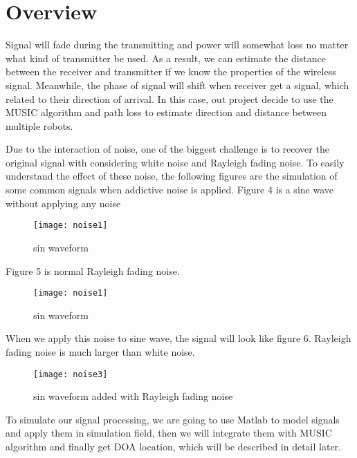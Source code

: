 
\section{Overview}
\label{sec:overview}
	Signal will fade during the transmitting and power will somewhat loss no matter what kind of transmitter be used. As a result, we can estimate the distance between the receiver and transmitter if we know the properties of the wireless signal. Meanwhile, the phase of signal will shift when receiver get a signal, which related to their direction of arrival. In this case, out project decide to use the MUSIC algorithm and path loss to estimate direction and distance between multiple robots.
\par
	Due to the interaction of noise, one of the biggest challenge is to recover the original signal with considering white noise and Rayleigh fading noise. To easily understand the effect of these noise, the following figures are the simulation of some common signals when addictive noise is applied. Figure 4 is a sine wave without applying any noise 
\begin{figure}[ht]
	\centering
	\texttt{[image: noise1]}
	\caption{sin waveform}
	\end{figure}	
\par	
Figure 5 is normal Rayleigh fading noise. \\
	\begin{figure}[ht]
	\centering
	\texttt{[image: noise1]}
	\caption{sin waveform}
	\end{figure}
\par
	When we apply this noise to sine wave, the signal will look like figure 6. Rayleigh fading noise is much larger than white noise.  		

	\begin{figure}[ht]
	\centering
	\texttt{[image: noise3]}
	\caption{sin waveform added with Rayleigh fading noise}
	\end{figure}
	
	
	
	
	\par
	To simulate our signal processing, we are going to use Matlab to model signals and apply them in simulation field, then we will integrate them with MUSIC algorithm and finally get DOA location, which will be described in detail later. 



